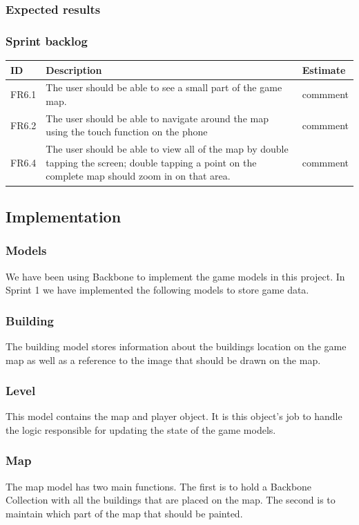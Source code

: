 \subsubsection{Expected results}


\subsubsection{Sprint backlog}
\begin{tabular}{| p{1cm} | p{8cm} | p{3cm} |}
	\hline
	\rowcolor{gray}
	ID & Description & Estimate \\ \hline
	FR6.1 & The user should be able to see a small part of the game map. & commment \\ \hline
	FR6.2 & The user should be able to navigate around the map using the touch function on the phone & commment \\ \hline
	FR6.4 & The user should be able to view all of the map by double tapping the screen; double tapping a point on the complete map should zoom in on that area. & commment \\
	\hline
\end{tabular}

\subsection{Implementation}

\subsubsection{Models}
We have been using Backbone to implement the game models in this project. In Sprint 1 we have implemented 
the following models to store game data.
\subsubsection*{Building}
The building model stores information about the buildings location on the game map as well as a reference 
to the image that should be drawn on the map.
\subsubsection*{Level}
This model contains the map and player object. It is this object's job to handle the logic responsible for 
updating the state of the game models.
\subsubsection*{Map}
The map model has two main functions. The first is to hold a Backbone Collection with all the buildings 
that are placed on the map. The second is to maintain which part of the map that should be painted.
